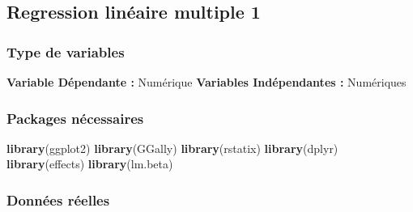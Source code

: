 \documentclass[
]{book}
\newenvironment{Shaded}{\begin{snugshade}}{\end{snugshade}}
\newcommand{\KeywordTok}[1]{\textcolor[rgb]{0.13,0.29,0.53}{\textbf{#1}}}
\newcommand{\NormalTok}[1]{#1}
\begin{document}
\hypertarget{regression-linuxe9aire-multiple-1}{%
\subsection{Regression linéaire multiple 1}\label{regression-linuxe9aire-multiple-1}}

\hypertarget{type-de-variables-4}{%
\subsubsection{Type de variables}\label{type-de-variables-4}}

\textbf{Variable Dépendante :} Numérique
\textbf{Variables Indépendantes :} Numériques

\hypertarget{packages-nuxe9cessaires-4}{%
\subsubsection{Packages nécessaires}\label{packages-nuxe9cessaires-4}}

\begin{Shaded}
\begin{Highlighting}[]
\KeywordTok{library}\NormalTok{(ggplot2)}
\KeywordTok{library}\NormalTok{(GGally)}
\KeywordTok{library}\NormalTok{(rstatix)}
\KeywordTok{library}\NormalTok{(dplyr)}
\KeywordTok{library}\NormalTok{(effects)}
\KeywordTok{library}\NormalTok{(lm.beta)}
\end{Highlighting}
\end{Shaded}

\hypertarget{donnuxe9es-ruxe9elles-4}{%
\subsubsection{Données réelles}\label{donnuxe9es-ruxe9elles-4}}
\end{document}

